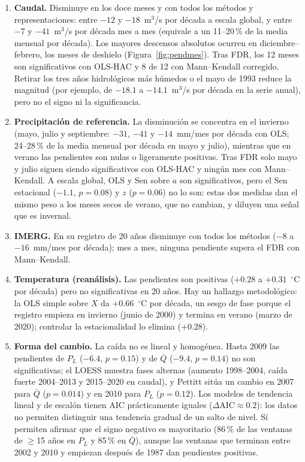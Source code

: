 \documentclass[11pt,letterpaper]{article}
\begin{document}
\begin{enumerate}
\item \textbf{Caudal.} Disminuye en los doce meses y con todos los métodos y representaciones: entre $-12$ y
$-18$~m$^3$/s por década a escala global, y entre $-7$ y $-41$~m$^3$/s por década mes a mes (equivale a un
11--20\,\% de la media mensual por década). Los mayores descensos absolutos ocurren en diciembre--febrero,
los meses de deshielo (Figura~\ref{fig:pendmes}). Tras FDR, los 12 meses son significativos con OLS-HAC y
8 de 12 con Mann--Kendall corregido. Retirar los tres años hidrológicos más húmedos o el mayo de 1993 reduce
la magnitud (por ejemplo, de $-18.1$ a $-14.1$~m$^3$/s por década en la serie anual), pero no el signo ni la
significancia.
\item \textbf{Precipitación de referencia.} La disminución se concentra en el invierno (mayo, julio y
septiembre: $-31$, $-41$ y $-14$~mm/mes por década con OLS; 24--28\,\% de la media mensual por década en
mayo y julio), mientras que en verano las pendientes son nulas o ligeramente positivas. Tras FDR solo mayo y
julio siguen siendo significativos con OLS-HAC y ningún mes con Mann--Kendall. A escala global, OLS y Sen
sobre $a$ son significativos, pero el Sen estacional ($-1.1$, $p=0.08$) y $z$ ($p=0.06$) no lo son: estas dos
medidas dan el mismo peso a los meses secos de verano, que no cambian, y diluyen una señal que es invernal.
\item \textbf{IMERG.} En su registro de 20 años disminuye con todos los métodos ($-8$ a $-16$~mm/mes por década);
mes a mes, ninguna pendiente supera el FDR con Mann--Kendall.
\item \textbf{Temperatura (reanálisis).} Las pendientes son positivas ($+0.28$ a $+0.31$~$^\circ$C por década) pero
no significativas en 20 años. Hay un hallazgo metodológico: la OLS simple sobre $X$ da $+0.66$~$^\circ$C por
década, un sesgo de fase porque el registro empieza en invierno (junio de 2000) y termina en verano
(marzo de 2020); controlar la estacionalidad lo elimina ($+0.28$).
\item \textbf{Forma del cambio.} La caída no es lineal y homogénea. Hasta 2009 las pendientes de $P_L$
($-6.4$, $p=0.15$) y de $\overline{Q}$ ($-9.4$, $p=0.14$) no son significativas; el LOESS muestra fases
alternas (aumento 1998--2004, caída fuerte 2004--2013 y 2015--2020 en caudal), y Pettitt sitúa un cambio en
2007 para $\overline{Q}$ ($p=0.014$) y en 2010 para $P_L$ ($p=0.12$). Los modelos de tendencia lineal y de escalón
tienen AIC prácticamente iguales ($\Delta\mathrm{AIC}\approx0.2$): los datos no permiten distinguir una tendencia
gradual de un salto de nivel. Sí permiten afirmar que el signo negativo es mayoritario (86\,\% de las ventanas
de $\geq$15 años en $P_L$ y 85\,\% en $\overline{Q}$), aunque las ventanas que terminan entre 2002 y 2010 y
empiezan después de 1987 dan pendientes positivas.
\end{enumerate}
\end{document}
